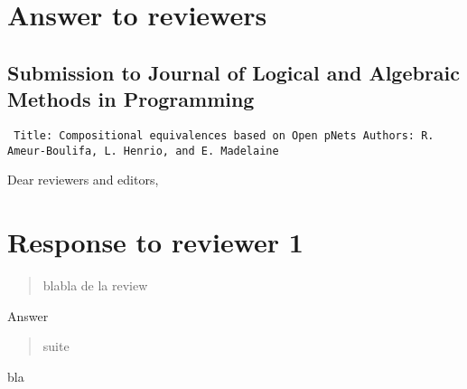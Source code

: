 \documentclass[10pt]{article}
\newenvironment{ttbox}{\begin{alltt}\small\tt}%
                      {\end{alltt}}
\newenvironment{review}{\bgroup\itshape\begin{quote}}{\end{quote}\egroup}
\begin{document}
\section*{Answer to reviewers }
\subsection*{Submission to Journal of Logical and Algebraic Methods in Programming}
\medskip
\begin{ttbox}
Title: Compositional equivalences based on Open pNets
Authors: R. Ameur-Boulifa, L. Henrio, and E. Madelaine
\end{ttbox}
\bigskip
Dear reviewers and editors,



\section*{Response to reviewer 1}

\begin{review}
blabla de la review
\end{review}
Answer

\begin{review}
suite
\end{review}
bla
\end{document}
